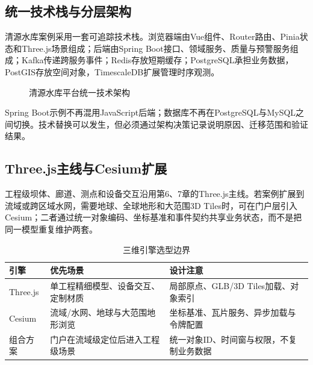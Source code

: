 \subsection{统一技术栈与分层架构}

清源水库案例采用一套可追踪技术栈。浏览器端由Vue组件、Router路由、Pinia状态和Three.js场景组成；后端由Spring Boot接口、领域服务、质量与预警服务组成；Kafka传递跨服务事件；Redis存放短期缓存；PostgreSQL承担业务数据，PostGIS存放空间对象，TimescaleDB扩展管理时序观测。

\begin{figure}[htbp]
\centering
{}
\caption{清源水库平台统一技术架构}
\label{fig:case-layered-architecture}
\end{figure}

Spring Boot示例不再混用JavaScript后端；数据库不再在PostgreSQL与MySQL之间切换。技术替换可以发生，但必须通过架构决策记录说明原因、迁移范围和验证结果。

\subsection{Three.js主线与Cesium扩展}

工程级坝体、廊道、测点和设备交互沿用第6、7章的Three.js主线。若案例扩展到流域或跨区域水网，需要地球、全球地形和大范围3D Tiles时，可在门户层引入Cesium；二者通过统一对象编码、坐标基准和事件契约共享业务状态，而不是把同一模型重复维护两套。

\begin{table}[htbp]
\centering
\caption{三维引擎选型边界}
\label{tab:three-cesium-selection}
\begin{tabular}{p{2.4cm}p{4.6cm}p{5.3cm}}
\toprule
引擎 & 优先场景 & 设计注意 \\
\midrule
Three.js & 单工程精细模型、设备交互、定制材质 & 局部原点、GLB/3D Tiles加载、对象索引 \\
Cesium & 流域/水网、地球与大范围地形浏览 & 坐标基准、瓦片服务、异步加载与令牌配置 \\
组合方案 & 门户在流域级定位后进入工程级场景 & 统一对象ID、时间窗与权限，不复制业务数据 \\
\bottomrule
\end{tabular}
\end{table}

